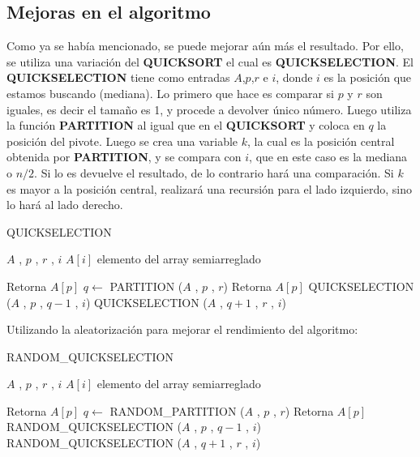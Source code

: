 \documentclass[final,a4paper,romanappendices]{IEEEtran}\usepackage[]{graphicx}\usepackage[]{color}
\theoremstyle{definition}
\begin{document}
\subsection{Mejoras en el algoritmo}
Como ya se había mencionado, se puede mejorar aún más el resultado. Por ello, se utiliza una variación del {\bf{QUICKSORT}} el cual es {\bf{QUICKSELECTION}}.
El {\bf{QUICKSELECTION}} tiene como entradas $A$,$p$,$r$ e $i$, donde $i$ es la posición que estamos buscando (mediana). Lo primero que hace es comparar si $p$ y $r$ son iguales, es decir el tamaño es 1, y procede a devolver único número. Luego utiliza la función {\bf{PARTITION}} al igual que en el {\bf{QUICKSORT}} y coloca en $q$ la posición del pivote. Luego se crea una variable $k$, la cual es la posición central obtenida por {\bf{PARTITION}}, y se compara con $i$, que en este caso es la mediana o $n/2$. Si lo es devuelve el resultado, de lo contrario hará una comparación. Si $k$ es mayor a la posición central, realizará una recursión para el lado izquierdo, sino lo hará al lado derecho.

\begin{algorithm}[h]
	\caption{QUICKSELECTION}
	\begin{algorithmic}[1]
		
		\Require $A$ , $p$ , $r$ , $i$
		\Ensure $A[i]$ elemento del array semiarreglado
		
			\State Retorna $A[p]$
		\EndIf
		\State $q \gets $ PARTITION ($A$ , $p$ , $r$)
			\State Retorna $A[p]$
		\Else
				\State QUICKSELECTION ($A$ , $p$ , $q-1$ , $i$)
			\Else
				\State QUICKSELECTION ($A$ , $q+1$ , $r$ , $i$)
			\EndIf
		\EndIf
	\end{algorithmic}
\end{algorithm}

Utilizando la aleatorización para mejorar el rendimiento del algoritmo:

\begin{algorithm}[H]
	\caption{RANDOM\_QUICKSELECTION}
	\begin{algorithmic}[1]
		
		\Require $A$ , $p$ , $r$ , $i$
		\Ensure $A[i]$ elemento del array semiarreglado
		
		\If{ $p = r$ }
			\State Retorna $A[p]$
		\EndIf
		\State $q \gets $ RANDOM\_PARTITION ($A$ , $p$ , $r$)
		\If{ $q = i$ }
			\State Retorna $A[p]$
		\Else
			\If { $q > i$ }
				\State RANDOM\_QUICKSELECTION ($A$ , $p$ , $q-1$ , $i$)
			\Else
				\State RANDOM\_QUICKSELECTION ($A$ , $q+1$ , $r$ , $i$)
			\EndIf
		\EndIf
	\end{algorithmic}
\end{algorithm}
\end{document}
